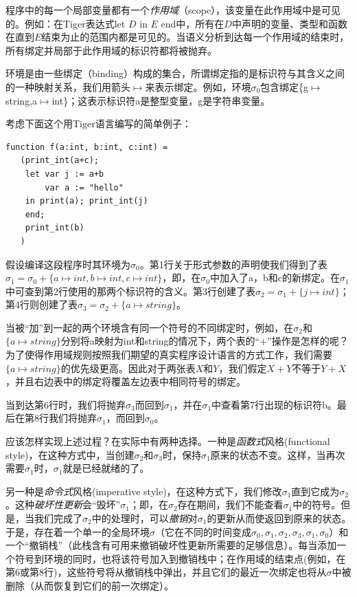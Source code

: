 \documentclass[cn,11pt,chinese]{elegantbook}
\begin{document}
程序中的每一个局部变量都有一个\textit{作用域}（scope），该变量在此作用域中是可见的。例如：在Tiger表达式let $D$ in $E$ end中，所有在$D$中声明的变量、类型和函数在直到$E$结束为止的范围内都是可见的。当语义分析到达每一个作用域的结束时，所有绑定并局部于此作用域的标识符都将被抛弃。

环境是由一些绑定（binding）构成的集合，所谓绑定指的是标识符与其含义之间的一种映射关系，我们用箭头$\mapsto$来表示绑定。例如，环境$\sigma_0$包含绑定\{g$\mapsto$string,a$\mapsto$int\}；这表示标识符a是整型变量，g是字符串变量。

考虑下面这个用Tiger语言编写的简单例子：

\begin{lstlisting}
function f(a:int, b:int, c:int) =
   (print_int(a+c);
    let var j := a+b
        var a := "hello"
    in print(a); print_int(j)
    end;
    print_int(b)
   )
\end{lstlisting}

假设编译这段程序时其环境为$\sigma_0$。第1行关于形式参数的声明使我们得到了表$\sigma_1 = \sigma_0 + \{a\mapsto int,b\mapsto int, c\mapsto int\}$，即，在$\sigma_0$中加入了a，b和c的新绑定。在$\sigma_1$中可查到第2行使用的那两个标识符的含义。第3行创建了表$\sigma_2=\sigma_1+\{j\mapsto int\}$；第4行则创建了表$\sigma_3=\sigma_2+\{a\mapsto string\}$。

当被“加”到一起的两个环境含有同一个符号的不同绑定时，例如，在$\sigma_2$和$\{a\mapsto string\}$分别将a映射为int和string的情况下，两个表的“+”操作是怎样的呢？为了使得作用域规则按照我们期望的真实程序设计语言的方式工作，我们需要$\{a\mapsto string\}$的优先级更高。因此对于两张表$X$和$Y$，我们假定$X+Y$不等于$Y+X$，并且右边表中的绑定将覆盖左边表中相同符号的绑定。

当到达第6行时，我们将抛弃$\sigma_3$而回到$\sigma_1$，并在$\sigma_1$中查看第7行出现的标识符b。最后在第8行我们将抛弃$\sigma_1$，而回到$\sigma_0$。

应该怎样实现上述过程？在实际中有两种选择。一种是\textit{函数式}风格(functional style)，在这种方式中，当创建$\sigma_2$和$\sigma_3$时，保持$\sigma_1$原来的状态不变。这样，当再次需要$\sigma_1$时，$\sigma_1$就是已经就绪的了。

另一种是\textit{命令式}风格(imperative style)，在这种方式下，我们修改$\sigma_1$直到它成为$\sigma_2$。这种\textit{破坏性更新}会“毁坏”$\sigma_1$；即，在$\sigma_2$存在期间，我们不能查看$\sigma_1$中的符号。但是，当我们完成了$\sigma_2$中的处理时，可以\textit{撤销}对$\sigma_1$的更新从而使返回到原来的状态。于是，存在着一个单一的全局环境$\sigma$（它在不同的时间变成$\sigma_0,\sigma_1,\sigma_2,\sigma_3,\sigma_1,\sigma_0$）和一个“撤销栈”（此栈含有可用来撤销破坏性更新所需要的足够信息）。每当添加一个符号到环境的同时，也将该符号加入到撤销栈中；在作用域的结束点(例如，在第6或第8行)，这些符号将从撤销栈中弹出，并且它们的最近一次绑定也将从$\sigma$中被删除（从而恢复到它们的前一次绑定）。
\end{document}
